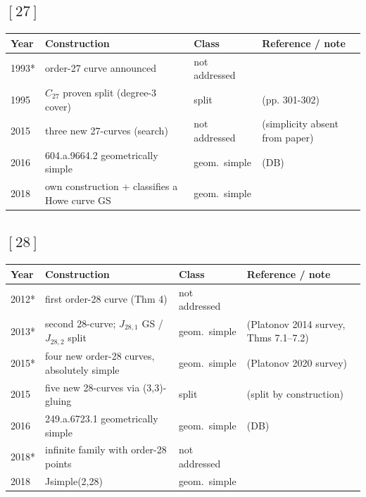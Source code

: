 \documentclass[10pt]{amsart}
\begin{document}
\subsection*{$[27]$}
\begin{longtable}{p{0.9cm} p{7.6cm} p{2.3cm} p{4.2cm}}
\hline Year & Construction & Class & Reference / note \\ \hline
1993* & order-27 curve announced & not addressed & \cite{Leprevost1993}\\
1995 & $C_{27}$ proven split (degree-3 cover) & split & \cite{Leprevost1995} (pp. 301-302)\\
2015 & three new 27-curves (search) & not addressed & \cite{Howe2015} (simplicity absent from paper)\\
2016 & 604.a.9664.2 geometrically simple & geom.\ simple & \cite{BSSVY} (DB)\\
2018 & own construction + classifies a Howe curve GS & geom.\ simple & \cite{Nicholls2018}\\
\hline\end{longtable}
\subsection*{$[28]$}
\begin{longtable}{p{0.9cm} p{7.6cm} p{2.3cm} p{4.2cm}}
\hline Year & Construction & Class & Reference / note \\ \hline
2012* & first order-28 curve (Thm 4) & not addressed & \cite{PP2012}\\
2013* & second 28-curve; $J_{28,1}$ GS / $J_{28,2}$ split & geom.\ simple & \cite{PZP2013} (Platonov 2014 survey, Thms 7.1--7.2)\\
2015* & four new order-28 curves, absolutely simple & geom.\ simple & \cite{PP2015} (Platonov 2020 survey)\\
2015 & five new 28-curves via (3,3)-gluing & split & \cite{Howe2015} (split by construction)\\
2016 & 249.a.6723.1 geometrically simple & geom.\ simple & \cite{BSSVY} (DB)\\
2018* & infinite family with order-28 points & not addressed & \cite{PF2018}\\
2018 & Jsimple(2,28) & geom.\ simple & \cite{Nicholls2018}\\
\hline\end{longtable}
\end{document}
